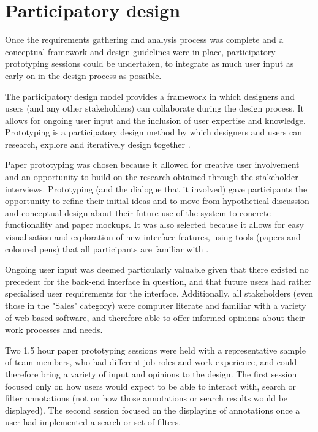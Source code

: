 \section{Participatory design}
Once the requirements gathering and analysis process was complete and a conceptual framework and design guidelines were in place, participatory prototyping sessions could be undertaken, to integrate as much user input as early on in the design process as possible. 

The participatory design model provides a framework in which designers and users (and any other stakeholders) can collaborate during the design process. It allows for ongoing user input and the inclusion of user expertise and knowledge. Prototyping is a participatory design method by which designers and users can research, explore and iteratively design together \citep{Spinuzzi}.   

Paper prototyping was chosen because it allowed for creative user involvement and an opportunity to build on the research obtained through the stakeholder interviews. Prototyping (and the dialogue that it involved) gave participants the opportunity to refine their initial ideas and to move from hypothetical discussion and conceptual design about their future use of the system to concrete functionality and paper mockups. It was also selected because it allows for easy visualisation and exploration of new interface features, using tools (papers and coloured pens) that all participants are familiar with \citep[p. 380]{HackosRedish}. 

Ongoing user input was deemed particularly valuable given that there existed no precedent for the back-end interface in question, and that future users had rather specialised user requirements for the interface. Additionally, all stakeholders (even those in the "Sales" category) were computer literate and familiar with a variety of web-based software, and therefore able to offer informed opinions about their work processes and needs. 

Two 1.5 hour paper prototyping sessions were held with a representative sample of team members, who had different job roles and work experience, and could therefore bring a variety of input and opinions to the design. The first session focused only on how users would expect to be able to interact with, search or filter annotations (not on how those annotations or search results would be displayed). The second session focused on the displaying of annotations once a user had implemented a search or set of filters. 

